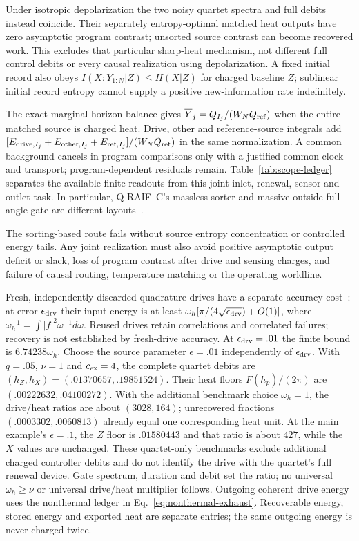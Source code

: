 \documentclass[12pt,a4paper]{article}
\begin{document}
Under isotropic depolarization the two noisy quartet spectra and full
debits instead coincide. Their separately entropy-optimal matched heat
outputs have zero asymptotic program contrast; unsorted source contrast
can become recovered work. This excludes that particular sharp-heat
mechanism, not different full control debits or every causal realization
using depolarization. A fixed initial record also obeys
$I(X:Y_{1:N}|Z)\le H(X|Z)$ for charged baseline $Z$; sublinear initial
record entropy cannot supply a positive new-information rate indefinitely.

The exact marginal-horizon balance gives
$\overline Y_j=Q_{I_j}/(W_NQ_{\rm ref})$ when the entire matched
source is charged heat. Drive, other and reference-source integrals
add $[E_{{\rm drive},I_j}+E_{{\rm other},I_j}
+E_{{\rm ref},I_j}]/(W_NQ_{\rm ref})$ in the same normalization. A common background cancels in
program comparisons only with a justified common clock and transport;
program-dependent residuals remain. Table~\ref{tab:scope-ledger} separates the available finite readouts
from this joint inlet, renewal, sensor and outlet task. In particular,
Q-RAIF~C's massless sorter and massive-outside full-angle gate are
different layouts~\cite{QRC}.

The sorting-based route fails without source entropy concentration or
controlled energy tails. Any joint realization must also avoid positive
asymptotic output deficit or slack, loss of program contrast after drive
and sensing charges, and failure of causal routing, temperature matching
or the operating worldline.

Fresh, independently discarded quadrature drives have a separate
accuracy cost~\cite{Liu2026QRAIFB}: at error $\epsilon_{\rm drv}$ their
input energy is at least $\omega_h[\pi/(4\sqrt{\epsilon_{\rm drv}})+O(1)]$,
where $\omega_h^{-1}=\int|f|^2\omega^{-1}d\omega$.
Reused drives retain correlations and correlated failures; recovery is
not established by fresh-drive accuracy. At $\epsilon_{\rm drv}=.01$
the finite bound is $6.74238\omega_h$. Choose the source parameter
$\epsilon=.01$ independently of $\epsilon_{\rm drv}$.
With $q=.05$, $\nu=1$ and $c_{\rm ex}=4$, the complete quartet debits are
$(h_Z,h_X)=(.01370657,.19851524)$. Their heat floors
$F(h_p)/(2\pi)$ are $(.00222632,.04100272)$.
With the additional benchmark choice $\omega_h=1$, the drive/heat
ratios are about $(3028,164)$; unrecovered fractions
$(.0003302,.0060813)$ already equal one corresponding heat unit.
At the main example's $\epsilon=.1$, the $Z$ floor is $.01580443$
and that ratio is about $427$, while the $X$ values are unchanged.
These quartet-only benchmarks exclude additional charged controller
debits and do not identify the drive with the quartet's full renewal
device. Gate spectrum, duration and debit set the ratio; no universal
$\omega_h\ge\nu$ or universal drive/heat multiplier follows. Outgoing coherent
drive energy uses the nonthermal ledger in Eq.~\eqref{eq:nonthermal-exhaust}.
Recoverable energy, stored energy and exported heat are separate entries;
the same outgoing energy is never charged twice.
\end{document}
